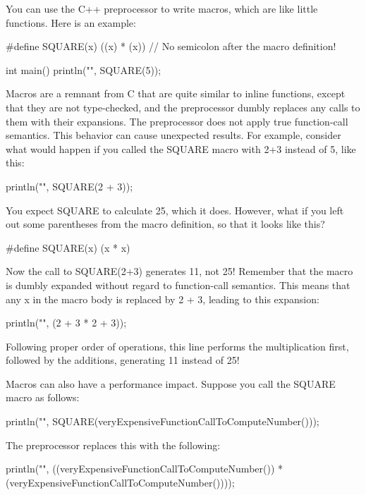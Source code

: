
You can use the C++ preprocessor to write macros, which are like little functions. Here is an example:

\begin{cpp}
#define SQUARE(x) ((x) * (x)) // No semicolon after the macro definition!

int main()
{
    println("{}", SQUARE(5));
}
\end{cpp}

Macros are a remnant from C that are quite similar to inline functions, except that they are not type-checked, and the preprocessor dumbly replaces any calls to them with their expansions. The preprocessor does not apply true function-call semantics. This behavior can cause unexpected results. For example, consider what would happen if you called the SQUARE macro with 2+3 instead of 5, like this:

\begin{cpp}
println("{}", SQUARE(2 + 3));
\end{cpp}

You expect SQUARE to calculate 25, which it does. However, what if you left out some parentheses from the macro definition, so that it looks like this?

\begin{cpp}
#define SQUARE(x) (x * x)
\end{cpp}

Now the call to SQUARE(2+3) generates 11, not 25! Remember that the macro is dumbly expanded without regard to function-call semantics. This means that any x in the macro body is replaced by 2 + 3, leading to this expansion:

\begin{cpp}
println("{}", (2 + 3 * 2 + 3));
\end{cpp}

Following proper order of operations, this line performs the multiplication first, followed by the additions, generating 11 instead of 25!

Macros can also have a performance impact. Suppose you call the SQUARE macro as follows:

\begin{cpp}
println("{}", SQUARE(veryExpensiveFunctionCallToComputeNumber()));
\end{cpp}

The preprocessor replaces this with the following:

\begin{cpp}
println("{}", ((veryExpensiveFunctionCallToComputeNumber()) *
        (veryExpensiveFunctionCallToComputeNumber())));
\end{cpp}

